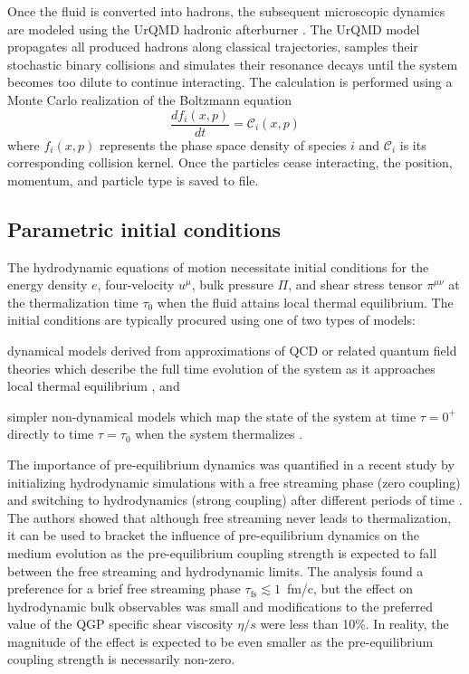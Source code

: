 \documentclass[aps,prc,reprint,amsmath,nofootinbib,superscriptaddress]{revtex4-1}
\begin{document}
Once the fluid is converted into hadrons, the subsequent microscopic dynamics are modeled using the UrQMD hadronic afterburner \cite{Bass:1998ca, Bleicher:1999xi}.
The UrQMD model propagates all produced hadrons along classical trajectories, samples their stochastic binary collisions and simulates their resonance decays until the system becomes too dilute to continue interacting.
The calculation is performed using a Monte Carlo realization of the Boltzmann equation
\begin{equation}
  \frac{df_i(x,p)}{dt} = \mathcal{C}_i(x, p)
\end{equation}
where $f_i(x,p)$ represents the phase space density of species $i$ and $\mathcal{C}_i$ is its corresponding collision kernel.
Once the particles cease interacting, the position, momentum, and particle type is saved to file.

\subsection{Parametric initial conditions}

The hydrodynamic equations of motion necessitate initial conditions for the energy density $e$, four-velocity $u^\mu$, bulk pressure $\Pi$, and shear stress tensor $\pi^{\mu\nu}$ at the thermalization time $\tau_0$ when the fluid attains local thermal equilibrium. The initial conditions are typically procured using one of two types of models:
\begin{enumerate*}[label={\arabic*)}]
  \item dynamical models derived from approximations of QCD or related quantum field theories which describe the full time evolution of the system as it approaches local thermal equilibrium \cite{Schenke:2012wb, vanderSchee:2013pia, Wang:1991hta}, and
  \item simpler non-dynamical models which map the state of the system at time $\tau=0^+$ directly to time $\tau=\tau_0$ when the system thermalizes \cite{}.
\end{enumerate*}

The importance of pre-equilibrium dynamics was quantified in a recent study by initializing hydrodynamic simulations with a free streaming phase (zero coupling) and switching to hydrodynamics (strong coupling) after different periods of time \cite{Liu:2015nwa}. The authors showed that although free streaming never leads to thermalization, it can be used to bracket the influence of pre-equilibrium dynamics on the medium evolution as the pre-equilibrium coupling strength is expected to fall between the free streaming and hydrodynamic limits. The analysis found a preference for a brief free streaming phase ${\tau_\text{fs} \lesssim 1}$~fm/c, but the effect on hydrodynamic bulk observables was small and modifications to the preferred value of the QGP specific shear viscosity $\eta/s$ were less than 10\%. In reality, the magnitude of the effect is expected to be even smaller as the pre-equilibrium coupling strength is necessarily non-zero.
\end{document}
